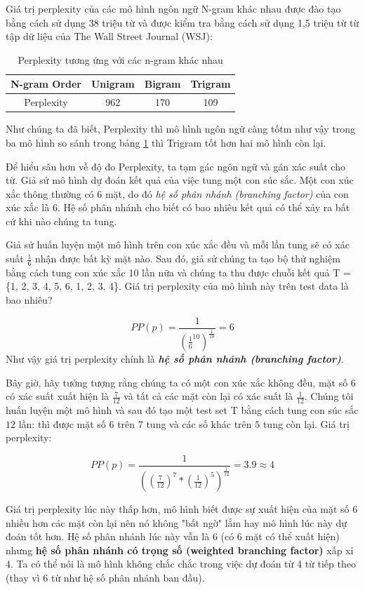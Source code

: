 Giá trị perplexity của các mô hình ngôn ngữ N-gram khác nhau được đào tạo bằng cách sử dụng 38 triệu từ và được kiểm tra bằng cách sử dụng 1,5 triệu từ từ tập dữ liệu của The Wall Street Journal (WSJ):
\begin{table}[H]
\centering
\begin{tabular}{ |c|c|c|c| } 
 \hline
 N-gram Order & Unigram & Bigram & Trigram \\ 
  \hline
 Perplexity & 962 & 170 & 109 \\ 
 \hline
\end{tabular}
\caption{Perplexity tương ứng với các n-gram khác nhau}
\label{Perplexity}
\end{table}
 Như chúng ta đã biết, Perplexity thì mô hình ngôn ngữ càng tốtm như vậy trong ba mô hình so sánh trong bảng \ref{Perplexity} thì Trigram tốt hơn hai mô hình còn lại.
 
 Để hiểu sâu hơn về độ đo Perplexity, ta tạm gác ngôn ngữ và gán xác suất cho từ. Giả sử mô hình dự đoán kết quả của việc tung một con súc sắc. Một con xúc xắc thông thường có 6 mặt, do đó \textit{hệ số phân nhánh (branching factor)} của con xúc xắc là 6. Hệ số phân nhánh cho biết có bao nhiêu kết quả có thể xảy ra bất cứ khi nào chúng ta tung.
 
 Giả sử huấn luyện một mô hình trên con xúc xắc đều và mỗi lần tung sẽ có xác suất $\frac{1}{6}$ nhận được bất kỳ mặt nào. Sau đó, giả sử chúng ta tạo bộ thử nghiệm bằng cách tung con xúc xắc 10 lần nữa và chúng ta thu được chuỗi kết quả  T = \{1, 2, 3, 4, 5, 6, 1, 2, 3, 4\}. Giá trị perplexity của mô hình này trên test data là bao nhiêu?
 
 $$PP(p)=\frac{1}{(\frac{1}{6}^{10})^{\frac{1}{10}}}=6$$
 Như vậy giá trị perplexity chính là \textbf{\textit{hệ số phân nhánh (branching factor)}}.
 
 Bây giờ, hãy tưởng tượng rằng chúng ta có một con xúc xắc không đều, mặt số 6 có xác suất xuất hiện là $\frac{7}{12}$ và tất cả các mặt còn lại có xác suất là $\frac{1}{12}$. Chúng tôi huấn luyện một mô hình và sau đó tạo một test set T bằng cách tung con súc sắc $12$ lần: thì được mặt số $6$ trên $7$ tung và các số khác trên $5$ tung còn lại. Giá trị perplexity: 
 
  $$PP(p)=\frac{1}{((\frac{7}{12})^{7}*(\frac{1}{12})^{5})^{\frac{1}{12}}}=3.9\approx 4$$
  
  Giá trị perplexity lúc này thấp hơn, mô hình biết được sự xuất hiện của mặt số 6 nhiều hơn các mặt còn lại nên nó không "bất ngờ" lắm hay mô hình lúc này dự đoán tốt hơn. Hệ số phân nhánh lúc này vẫn là 6 (có 6 mặt có thể xuất hiện) nhưng \textbf{hệ số phân nhánh có trọng số (weighted branching factor)} xấp xỉ 4. Ta có thể nói là mô hình không chắc chắc trong việc dự đoán từ 4 từ tiếp theo (thay vì 6 
 từ như hệ số phân nhánh ban đầu).
 

